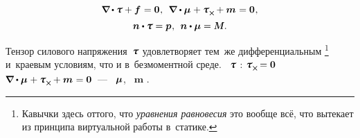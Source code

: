 \begin{otherlanguage}{russian}
\nopagebreak\vspace{-0.1em}\begin{equation}\label{micropolar.equilibrium:cauchy-like}
\boldnabla \hspace{-0.1ex} \dotp \forcestresstensor + \bm{f} \hspace{.12ex} = \bm{0} \hspace{.1ex} ,
\:\:
\boldnabla \dotp \couplestresstensor \hspace{.1ex} + \forcestresstensor_{\Xcompanion} \hspace{-0.1ex} + \bm{m} \hspace{.1ex} = \bm{0} \hspace{.1ex} ,
\end{equation}%
\nopagebreak\vspace{-1.1em}\begin{equation}\label{micropolar.equilibrium:boundaryconditions}
\bm{n} \dotp \forcestresstensor = \bm{p} \hspace{.1ex} ,
\:\:
\bm{n} \dotp \couplestresstensor = \mathboldM \hspace{.1ex} .
\end{equation}

\vspace{-0.5em} Тензор силового напряжения~$\forcestresstensor$ удовлетворяет тем~же дифференциальным \footnote{Кавычки здесь оттого, что \emph{уравнения равновесия} это вообще всё, что вытекает из принципа виртуальной работы в~статике.} \hspace{-0.5em} и~краевым условиям, что и в~безмоментной среде. ~$\forcestresstensor$ :  ${\forcestresstensor_{\Xcompanion} \hspace{-0.2ex} = \bm{0}}$  ${\hspace{-0.1ex} \boldnabla \dotp \couplestresstensor \hspace{.1ex} + \forcestresstensor_{\Xcompanion} \hspace{-0.1ex} + \bm{m} \hspace{.1ex} = \bm{0}}$~--- ~$\bm{\mu}$,   ~$\bm{m}$ .


\end{otherlanguage}
